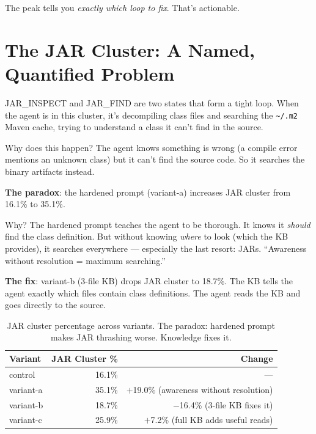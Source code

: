 \documentclass[11pt,a4paper]{article}
\begin{document}
The peak tells you \emph{exactly which loop to fix}. That's actionable.

\section{The JAR Cluster: A Named, Quantified Problem}

JAR\_INSPECT and JAR\_FIND are two states that form a tight loop.
When the agent is in this cluster, it's decompiling class files and searching
the \texttt{\textasciitilde/.m2} Maven cache, trying to understand a class it can't find in the source.

Why does this happen?
The agent knows something is wrong (a compile error mentions an unknown class)
but it can't find the source code.
So it searches the binary artifacts instead.

\textbf{The paradox}: the hardened prompt (variant-a) increases JAR cluster from 16.1\% to 35.1\%.

Why? The hardened prompt teaches the agent to be thorough.
It knows it \emph{should} find the class definition.
But without knowing \emph{where} to look (which the KB provides),
it searches everywhere --- especially the last resort: JARs.
``Awareness without resolution = maximum searching.''

\textbf{The fix}: variant-b (3-file KB) drops JAR cluster to 18.7\%.
The KB tells the agent exactly which files contain class definitions.
The agent reads the KB and goes directly to the source.

\begin{table}[H]
\centering
\begin{tabular}{@{}lrr@{}}
\toprule
\textbf{Variant} & \textbf{JAR Cluster \%} & \textbf{Change} \\
\midrule
control    & 16.1\% & --- \\
variant-a  & 35.1\% & $+$19.0\% (awareness without resolution) \\
variant-b  & 18.7\% & $-$16.4\% (3-file KB fixes it) \\
variant-c  & 25.9\% & $+$7.2\% (full KB adds useful reads) \\
\bottomrule
\end{tabular}
\caption{JAR cluster percentage across variants.
         The paradox: hardened prompt makes JAR thrashing worse.
         Knowledge fixes it.}
\label{tab:jar-cluster}
\end{table}
\end{document}

